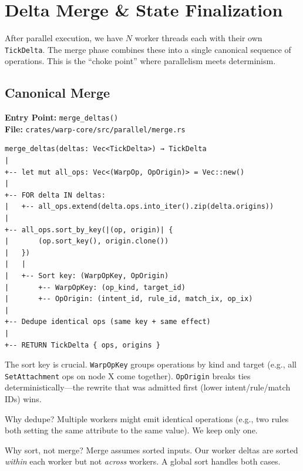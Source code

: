 
\chapter{Delta Merge \& State Finalization}
\label{chap:tour-merge}

\begin{bigpicture}
After parallel execution, we have $N$ worker threads each with their own \texttt{TickDelta}. The merge phase combines these into a single canonical sequence of operations. This is the ``choke point'' where parallelism meets determinism.
\end{bigpicture}

\section{Canonical Merge}

\textbf{Entry Point:} \texttt{merge\_deltas()} \\
\textbf{File:} \texttt{crates/warp-core/src/parallel/merge.rs}

\begin{verbatim}
merge_deltas(deltas: Vec<TickDelta>) → TickDelta
|
+-- let mut all_ops: Vec<(WarpOp, OpOrigin)> = Vec::new()
|
+-- FOR delta IN deltas:
|   +-- all_ops.extend(delta.ops.into_iter().zip(delta.origins))
|
+-- all_ops.sort_by_key(|(op, origin)| {
|       (op.sort_key(), origin.clone())
|   })
|   |
|   +-- Sort key: (WarpOpKey, OpOrigin)
|       +-- WarpOpKey: (op_kind, target_id)
|       +-- OpOrigin: (intent_id, rule_id, match_ix, op_ix)
|
+-- Dedupe identical ops (same key + same effect)
|
+-- RETURN TickDelta { ops, origins }
\end{verbatim}

\begin{commentary}
The sort key is crucial. \texttt{WarpOpKey} groups operations by kind and target (e.g., all \texttt{SetAttachment} ops on node X come together). \texttt{OpOrigin} breaks ties deterministically---the rewrite that was admitted first (lower intent/rule/match IDs) wins.

Why dedupe? Multiple workers might emit identical operations (e.g., two rules both setting the same attribute to the same value). We keep only one.

Why sort, not merge? Merge assumes sorted inputs. Our worker deltas are sorted \emph{within} each worker but not \emph{across} workers. A global sort handles both cases.
\end{commentary}

